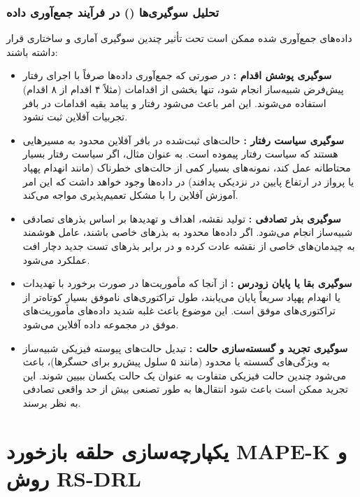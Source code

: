 \documentclass[oneside,openany,a4paper,12pt]{article}
\begin{document}
\subsubsection{تحلیل سوگیری‌ها () در فرآیند جمع‌آوری داده}
داده‌های جمع‌آوری شده ممکن است تحت تأثیر چندین سوگیری آماری و ساختاری قرار داشته باشند:
\begin{itemize}
    \item \textbf{سوگیری پوشش اقدام :} در صورتی که جمع‌آوری داده‌ها صرفاً با اجرای رفتار پیش‌فرض شبیه‌ساز انجام شود، تنها بخشی از اقدامات (مثلاً ۴ اقدام از ۸ اقدام) استفاده می‌شوند. این امر باعث می‌شود رفتار و پیامد بقیه اقدامات در بافر تجربیات آفلاین ثبت نشود.
    \item \textbf{سوگیری سیاست رفتار :} حالت‌های ثبت‌شده در بافر آفلاین محدود به مسیرهایی هستند که سیاست رفتار  پیموده است. به عنوان مثال، اگر سیاست رفتار بسیار محتاطانه عمل کند، نمونه‌های بسیار کمی از حالت‌های خطرناک (مانند انهدام پهپاد یا پرواز در ارتفاع پایین در نزدیکی پدافند) در داده‌ها وجود خواهد داشت که این امر آموزش آفلاین را با مشکل تعمیم‌پذیری مواجه می‌کند.
    \item \textbf{سوگیری بذر تصادفی :} تولید نقشه، اهداف و تهدیدها بر اساس بذر‌های تصادفی شبیه‌ساز انجام می‌شود. اگر داده‌ها محدود به بذرهای خاصی باشند، عامل هوشمند به چیدمان‌های خاصی از نقشه عادت کرده و در برابر بذرهای تست جدید دچار افت عملکرد می‌شود.
    \item \textbf{سوگیری بقا یا پایان زودرس :} از آنجا که مأموریت‌ها در صورت برخورد با تهدیدات یا انهدام پهپاد سریعاً پایان می‌یابند، طول تراکتوری‌های ناموفق بسیار کوتاه‌تر از تراکتوری‌های موفق است. این موضوع باعث غلبه شدید داده‌های مأموریت‌های موفق در مجموعه داده آفلاین می‌شود.
    \item \textbf{سوگیری تجرید و گسسته‌سازی حالت :} تبدیل حالت‌های پیوسته فیزیکی شبیه‌ساز به ویژگی‌های گسسته یا محدود (مانند ۵ سلول پیش‌رو برای حسگرها)، باعث می‌شود چندین حالت فیزیکی متفاوت به عنوان یک حالت یکسان ببیین شوند. این تجرید ممکن است باعث شود انتقال‌ها به طور تصنعی بیش از حد واقعی تصادفی به نظر برسند.
\end{itemize}




\section{یکپارچه‌سازی حلقه بازخورد MAPE-K و روش RS-DRL}
\end{document}
